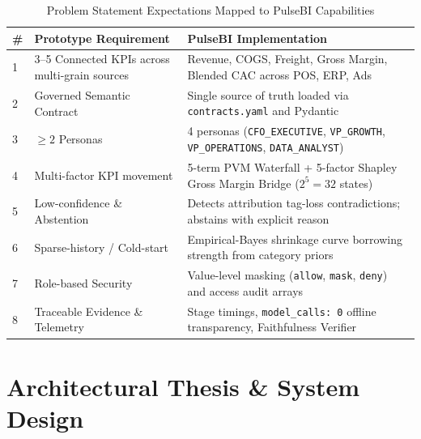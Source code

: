 \documentclass[11pt,a4paper]{article}
\begin{document}
\begin{table}[h!]
\centering
\caption{Problem Statement Expectations Mapped to PulseBI Capabilities}
\label{tab:prototype_mapping}
\small
\begin{tabular}{lp{6.5cm}p{6cm}}
\toprule
\textbf{\#} & \textbf{Prototype Requirement} & \textbf{PulseBI Implementation} \\
\midrule
1 & 3--5 Connected KPIs across multi-grain sources & Revenue, COGS, Freight, Gross Margin, Blended CAC across POS, ERP, Ads \\
2 & Governed Semantic Contract & Single source of truth loaded via \texttt{contracts.yaml} and Pydantic \\
3 & $\ge 2$ Personas & 4 personas (\texttt{CFO\_EXECUTIVE}, \texttt{VP\_GROWTH}, \texttt{VP\_OPERATIONS}, \texttt{DATA\_ANALYST}) \\
4 & Multi-factor KPI movement & 5-term PVM Waterfall + 5-factor Shapley Gross Margin Bridge ($2^5=32$ states) \\
5 & Low-confidence \& Abstention & Detects attribution tag-loss contradictions; abstains with explicit reason \\
6 & Sparse-history / Cold-start & Empirical-Bayes shrinkage curve borrowing strength from category priors \\
7 & Role-based Security & Value-level masking (\texttt{allow}, \texttt{mask}, \texttt{deny}) and access audit arrays \\
8 & Traceable Evidence \& Telemetry & Stage timings, \texttt{model\_calls: 0} offline transparency, Faithfulness Verifier \\
\bottomrule
\end{tabular}
\end{table}

\newpage

\section{Architectural Thesis \& System Design}
\end{document}
